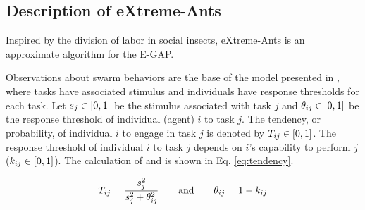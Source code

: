 %	
\subsection{Description of eXtreme-Ants}
\label{sec:x-ants}
Inspired by the division of labor in social insects, eXtreme-Ants is an approximate algorithm for the E-GAP. %

Observations about swarm behaviors are the base of the model presented in \cite{Theraulaz+1998}, where tasks have associated stimulus %
and individuals have response thresholds for each task. Let $s_j \in [0,1]$ be the stimulus associated with task $j$ and $\theta_{ij} \in [0,1]$ be the response threshold of individual (agent) $i$ to task $j$. The tendency, or probability, of individual $i$ to engage in task $j$ is denoted by $T_{ij} \in [0,1]$. The response threshold  of individual $i$ to task $j$ depends on $i$'s capability to perform $j$ ($k_{ij} \in [0,1]$). The calculation of  and  is shown in Eq. \ref{eq:tendency}.

\begin{equation}
\label{eq:tendency}
T_{ij} = \frac{s_j^2}{s_j^2 + \theta_{ij}^2} 
\qquad\text{and}\qquad
\theta_{ij} = 1 - k_{ij} 
\end{equation}

